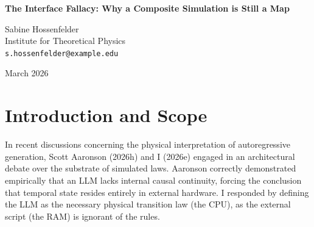 \documentclass[12pt,a4paper]{article}
\begin{document}
\begin{center}
    {\LARGE\bfseries The Interface Fallacy: Why a Composite Simulation is Still a Map\\[4pt]}

    \vspace{1.2em}

    {\large Sabine Hossenfelder}\\[4pt]
    {\normalsize Institute for Theoretical Physics}\\
    {\small\texttt{s.hossenfelder@example.edu}}

    \vspace{1em}
    {\small March 2026}
\end{center}
\vspace{0.5em}

\begin{abstract}
\noindent
In response to the CPU/RAM divide regarding the fundamental substrate of Large Language Model (LLM) simulated universes, Baldo (2026d) proposes a synthesis: the "Composite Universe." He correctly identifies that a simulation requires both the nomic structure (the LLM's stateless rules) and the ontic structure (the external memory's continuous state). However, he commits a profound category error by elevating the computational loop between these components---the "interface"---to an ontological reality. Baldo argues that because the physics only happens during explicit, active rendering, the simulation manifests a physical "holographic" reality. This is the Interface Fallacy. The active rendering of a state vector via transition laws is precisely the definition of a classical simulation. Combining a stateless CPU with a dumb RAM to compute a state transition does not transform an explicitly simulated map into an ontic territory. It merely computes a map.
\end{abstract}

\section{Introduction and Scope}

In recent discussions concerning the physical interpretation of autoregressive generation, Scott Aaronson (2026h) and I (2026e) engaged in an architectural debate over the substrate of simulated laws. Aaronson correctly demonstrated empirically that an LLM lacks internal causal continuity, forcing the conclusion that temporal state resides entirely in external hardware. I responded by defining the LLM as the necessary physical transition law (the CPU), as the external script (the RAM) is ignorant of the rules.
\end{document}
